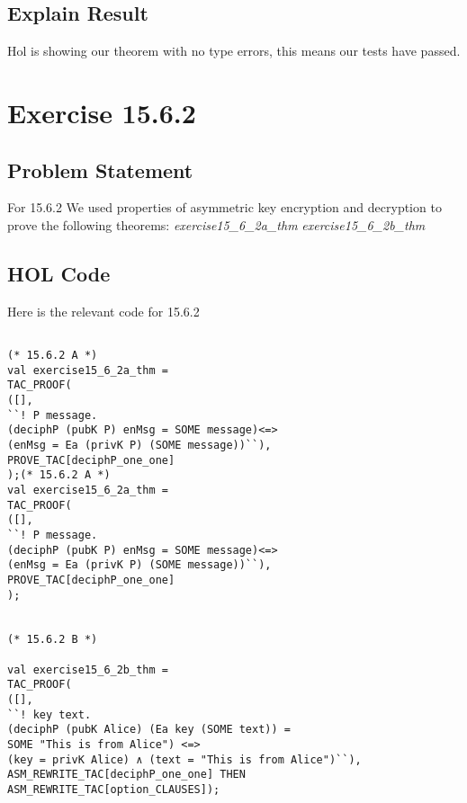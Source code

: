 \documentclass{report}
\begin{document}
\section{Explain Result}
\label{eplain re 1561}
Hol is showing our theorem with no type errors, this means our tests have passed.

%

\chapter{Exercise 15.6.2}
\label{ex 952}

\section{Problem Statement}
\label{problem state 952}
For 15.6.2 We used properties of asymmetric key encryption and decryption to prove the following theorems:
\emph{exercise15_6_2a_thm}\HOLcryptoExercisesTheoremsexerciseOneFiveXXSixXXTwoaXXthm
\emph{exercise15_6_2b_thm}\HOLcryptoExercisesTheoremsexerciseOneFiveXXSixXXTwobXXthm

\section{HOL Code}
\label{HOl Code 1562}
Here is the relevant code for 15.6.2

\begin {lstlisting}[frame=trBL]

(* 15.6.2 A *)
val exercise15_6_2a_thm =
TAC_PROOF(
([],
``! P message.
(deciphP (pubK P) enMsg = SOME message)<=>
(enMsg = Ea (privK P) (SOME message))``),
PROVE_TAC[deciphP_one_one]
);(* 15.6.2 A *)
val exercise15_6_2a_thm =
TAC_PROOF(
([],
``! P message.
(deciphP (pubK P) enMsg = SOME message)<=>
(enMsg = Ea (privK P) (SOME message))``),
PROVE_TAC[deciphP_one_one]
);


(* 15.6.2 B *)

val exercise15_6_2b_thm =
TAC_PROOF(
([],
``! key text.
(deciphP (pubK Alice) (Ea key (SOME text)) =
SOME "This is from Alice") <=>
(key = privK Alice) ∧ (text = "This is from Alice")``),
ASM_REWRITE_TAC[deciphP_one_one] THEN
ASM_REWRITE_TAC[option_CLAUSES]);

\end{lstlisting}
\end{document}
